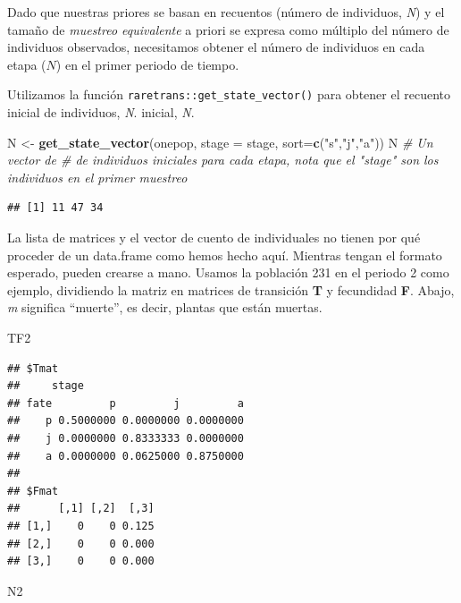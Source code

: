 \documentclass[
]{book}
\newenvironment{Shaded}{\begin{snugshade}}{\end{snugshade}}
\newcommand{\AttributeTok}[1]{\textcolor[rgb]{0.13,0.29,0.53}{#1}}
\newcommand{\CommentTok}[1]{\textcolor[rgb]{0.56,0.35,0.01}{\textit{#1}}}
\newcommand{\FunctionTok}[1]{\textcolor[rgb]{0.13,0.29,0.53}{\textbf{#1}}}
\newcommand{\NormalTok}[1]{#1}
\newcommand{\OtherTok}[1]{\textcolor[rgb]{0.56,0.35,0.01}{#1}}
\newcommand{\StringTok}[1]{\textcolor[rgb]{0.31,0.60,0.02}{#1}}
\theoremstyle{definition}
\theoremstyle{definition}
\theoremstyle{definition}
\theoremstyle{definition}
\theoremstyle{remark}
\begin{document}
Dado que nuestras priores se basan en recuentos (número de individuos,
\emph{N}) y el tamaño de \emph{muestreo equivalente} a priori se expresa como
múltiplo del número de individuos observados, necesitamos obtener el
número de individuos en cada etapa (\(N\)) en el primer periodo de tiempo.

Utilizamos la función \texttt{raretrans::get\_state\_vector()} para obtener el
recuento inicial de individuos, \emph{N}. inicial, \emph{N}.

\begin{Shaded}
\begin{Highlighting}[]
\NormalTok{N }\OtherTok{\textless{}{-}} \FunctionTok{get\_state\_vector}\NormalTok{(onepop, }\AttributeTok{stage =}\NormalTok{ stage, }\AttributeTok{sort=}\FunctionTok{c}\NormalTok{(}\StringTok{"s"}\NormalTok{,}\StringTok{"j"}\NormalTok{,}\StringTok{"a"}\NormalTok{)) }
\NormalTok{N }\CommentTok{\# Un vector de \# de individuos iniciales para cada etapa, nota que el "stage" son los individuos en el primer muestreo}
\end{Highlighting}
\end{Shaded}

\begin{verbatim}
## [1] 11 47 34
\end{verbatim}

La lista de matrices y el vector de cuento de individuales no tienen por
qué proceder de un data.frame como hemos hecho aquí. Mientras tengan el
formato esperado, pueden crearse a mano. Usamos la población 231 en el
periodo 2 como ejemplo, dividiendo la matriz en matrices de transición
\textbf{T} y fecundidad \textbf{F}. Abajo, \emph{m} significa ``muerte'', es decir,
plantas que están muertas.

\begin{Shaded}
\begin{Highlighting}[]
\NormalTok{TF2}
\end{Highlighting}
\end{Shaded}

\begin{verbatim}
## $Tmat
##     stage
## fate         p         j         a
##    p 0.5000000 0.0000000 0.0000000
##    j 0.0000000 0.8333333 0.0000000
##    a 0.0000000 0.0625000 0.8750000
## 
## $Fmat
##      [,1] [,2]  [,3]
## [1,]    0    0 0.125
## [2,]    0    0 0.000
## [3,]    0    0 0.000
\end{verbatim}

\begin{Shaded}
\begin{Highlighting}[]
\NormalTok{N2}
\end{Highlighting}
\end{Shaded}
\end{document}
